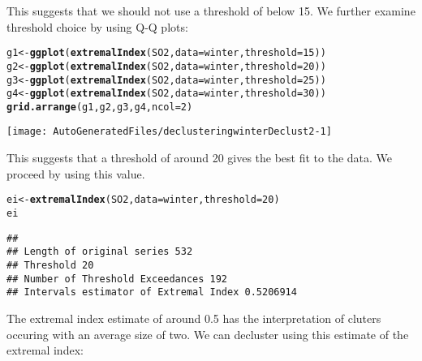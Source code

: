 \documentclass[10pt]{article}\usepackage[]{graphicx}\usepackage[]{color}
\makeatletter
\def\maxwidth{ %
  \ifdim\Gin@nat@width>\linewidth
    \linewidth
  \else
    \Gin@nat@width
  \fi
}
\newcommand{\hlnum}[1]{\textcolor[rgb]{0.686,0.059,0.569}{#1}}%
\newcommand{\hlstd}[1]{\textcolor[rgb]{0.345,0.345,0.345}{#1}}%
\newcommand{\hlkwb}[1]{\textcolor[rgb]{0.69,0.353,0.396}{#1}}%
\newcommand{\hlkwc}[1]{\textcolor[rgb]{0.333,0.667,0.333}{#1}}%
\newcommand{\hlkwd}[1]{\textcolor[rgb]{0.737,0.353,0.396}{\textbf{#1}}}%
\newenvironment{kframe}{%
 \def\at@end@of@kframe{}%
 \ifinner\ifhmode%
  \def\at@end@of@kframe{\end{minipage}}%
  \begin{minipage}{\columnwidth}%
 \fi\fi%
 \def\FrameCommand##1{\hskip\@totalleftmargin \hskip-\fboxsep
 \colorbox{shadecolor}{##1}\hskip-\fboxsep
     \hskip-\linewidth \hskip-\@totalleftmargin \hskip\columnwidth}%
 \MakeFramed {\advance\hsize-\width
   \@totalleftmargin\z@ \linewidth\hsize
   \@setminipage}}%
 {\par\unskip\endMakeFramed%
 \at@end@of@kframe}
\newenvironment{knitrout}{}{} %
\makeatother
\begin{document}
This suggests that we should not use a threshold of below 15.  We further examine threshold choice by using Q-Q plots:

\begin{knitrout}
\color{fgcolor}\begin{kframe}
\begin{alltt}
\hlstd{g1} \hlkwb{<-} \hlkwd{ggplot}\hlstd{(}\hlkwd{extremalIndex}\hlstd{(SO2,}\hlkwc{data}\hlstd{=winter,}\hlkwc{threshold}\hlstd{=}\hlnum{15}\hlstd{))}
\hlstd{g2} \hlkwb{<-} \hlkwd{ggplot}\hlstd{(}\hlkwd{extremalIndex}\hlstd{(SO2,}\hlkwc{data}\hlstd{=winter,}\hlkwc{threshold}\hlstd{=}\hlnum{20}\hlstd{))}
\hlstd{g3} \hlkwb{<-} \hlkwd{ggplot}\hlstd{(}\hlkwd{extremalIndex}\hlstd{(SO2,}\hlkwc{data}\hlstd{=winter,}\hlkwc{threshold}\hlstd{=}\hlnum{25}\hlstd{))}
\hlstd{g4} \hlkwb{<-} \hlkwd{ggplot}\hlstd{(}\hlkwd{extremalIndex}\hlstd{(SO2,}\hlkwc{data}\hlstd{=winter,}\hlkwc{threshold}\hlstd{=}\hlnum{30}\hlstd{))}
\hlkwd{grid.arrange}\hlstd{(g1,g2,g3,g4,}\hlkwc{ncol}\hlstd{=}\hlnum{2}\hlstd{)}
\end{alltt}
\end{kframe}
\texttt{[image: AutoGeneratedFiles/declusteringwinterDeclust2-1]} 

\end{knitrout}

This suggests that a threshold of around 20 gives the best fit to the data.  We proceed by using this value.

\begin{knitrout}
\color{fgcolor}\begin{kframe}
\begin{alltt}
\hlstd{ei} \hlkwb{<-} \hlkwd{extremalIndex}\hlstd{(SO2,}\hlkwc{data}\hlstd{=winter,}\hlkwc{threshold}\hlstd{=}\hlnum{20}\hlstd{)}
\hlstd{ei}
\end{alltt}
\begin{verbatim}
## 
## Length of original series 532 
## Threshold 20 
## Number of Threshold Exceedances 192 
## Intervals estimator of Extremal Index 0.5206914
\end{verbatim}
\end{kframe}
\end{knitrout}

The extremal index estimate of around 0.5 has the interpretation of cluters occuring with an average size of two.  We can decluster using this estimate of the extremal index:
\end{document}
